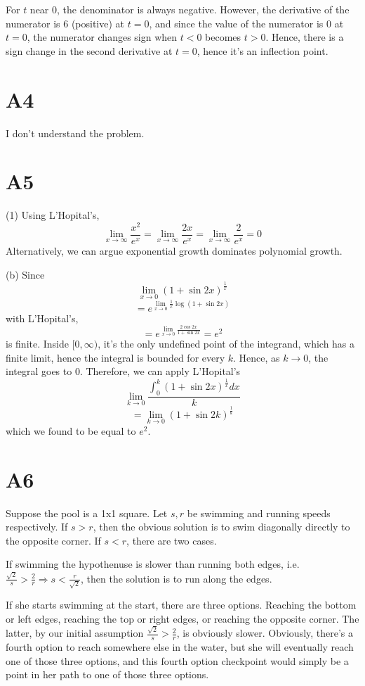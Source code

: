 \documentclass{book}
\begin{document}
For $t$ near $0$, the denominator is always negative. However, the derivative of the numerator is $6$ (positive) at $t = 0$, and since the value of the numerator is $0$ at $t = 0$, the numerator changes sign when $t < 0$ becomes $t > 0$. Hence, there is a sign change in the second derivative at $t = 0$, hence it's an inflection point.

\section*{A4}
I don't understand the problem.

\section*{A5}
(1)
Using L'Hopital's,
$$\lim_{x \to \infty} \frac{x^2}{e^x} = \lim_{x \to \infty} \frac{2x}{e^x} = \lim_{x \to \infty} \frac{2}{e^x} = 0$$
Alternatively, we can argue exponential growth dominates polynomial growth.

\noindent
(b)
Since
$$\lim_{x \to 0} (1 + \sin 2x)^{\frac{1}{x}}$$
$$= e^{\lim_{x \to 0} \frac{1}{x} \log (1 + \sin 2x)}$$
with L'Hopital's,
$$= e^{\lim_{x \to 0} \frac{2 \cos 2x}{1 + \sin 2x}} = e^2$$
is finite. Inside $[0, \infty)$, it's the only undefined point of the integrand, which has a finite limit, hence the integral is bounded for every $k$. Hence, as $k \to 0$, the integral goes to $0$. Therefore, we can apply L'Hopital's
$$\lim_{k \to 0} \frac{\int_0^k (1 + \sin 2x)^{\frac{1}{x}} dx}{k}$$
$$= \lim_{k \to 0} (1 + \sin 2k)^{\frac{1}{k}}$$
which we found to be equal to $e^2$.

\section*{A6}
Suppose the pool is a 1x1 square.
Let $s, r$ be swimming and running speeds respectively. If $s > r$, then the obvious solution is to swim diagonally directly to the opposite corner. If $s < r$, there are two cases.

If swimming the hypothenuse is slower than running both edges, i.e. $\frac{\sqrt{2}}{s} > \frac{2}{r} \Rightarrow s < \frac{r}{\sqrt{2}}$, then the solution is to run along the edges.

If she starts swimming at the start, there are three options. Reaching the bottom or left edges, reaching the top or right edges, or reaching the opposite corner. The latter, by our initial assumption $\frac{\sqrt{2}}{s} > \frac{2}{r}$, is obviously slower. Obviously, there's a fourth option to reach somewhere else in the water, but she will eventually reach one of those three options, and this fourth option checkpoint would simply be a point in her path to one of those three options.
\end{document}

